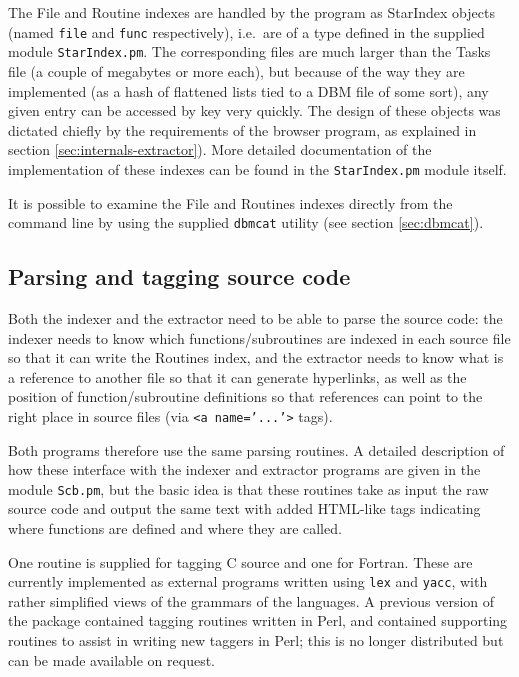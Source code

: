 \documentclass[twoside,11pt]{article}
\newcommand{\xlabel}[1]{}
\renewcommand{\_}{\texttt{\symbol{95}}}
\begin{document}
The File and Routine indexes are
handled by the program as StarIndex
objects (named {\tt file} and {\tt func} respectively),
i.e.\ are of a type
defined in the supplied module {\tt StarIndex.pm}.
The corresponding files are much larger than the Tasks file
(a couple of megabytes or more each),
but because of the way they are implemented
(as a hash of flattened lists tied to a DBM file of some sort),
any given entry can be accessed by key very quickly.
The design of these objects was dictated chiefly by the requirements
of the browser program, as explained in
section \ref{sec:internals-extractor}).
More detailed documentation of the implementation of these indexes
can be found in the {\tt StarIndex.pm} module itself.

It is possible to examine the File and Routines indexes
directly from the command line by using the supplied {\tt dbmcat}
utility (see section \ref{sec:dbmcat}).



\subsection{\xlabel{sec:internals-tagging}\label{sec:internals-tagging}Parsing and tagging source code}

Both the indexer and the extractor need to be able to parse the
source code: the indexer needs to know which
functions/subroutines are indexed in each source file so that
it can write the Routines index, and the extractor needs to know
what is a reference to another file so that it can generate
hyperlinks, as well as the position of function/subroutine
definitions so that references can point to the right place in
source files (via {\tt <a~name='...'>} tags).

Both programs therefore use the same parsing routines.
A detailed description of how these interface with
the indexer and extractor programs are given in the
module {\tt Scb.pm}, but the basic idea is that these routines
take as input the raw source code and output the same text
with added HTML-like tags indicating where functions are defined
and where they are called.

One routine is supplied for tagging C source and one for Fortran.
These are currently implemented as external programs
written using {\tt lex} and {\tt yacc}, with rather simplified
views of the grammars of the languages.
A previous version of the package contained tagging routines written
in Perl, and contained supporting routines to assist in writing new
taggers in Perl; this is no longer distributed but can
be made available on request.
\end{document}
